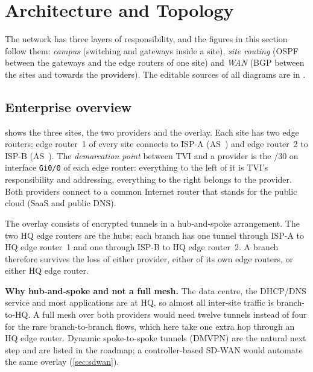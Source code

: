 \section{Architecture and Topology}\label{sec:arch}

The network has three layers of responsibility, and the figures in this section follow them:
\emph{campus} (switching and gateways inside a site), \emph{site routing} (OSPF between the gateways and
the edge routers of one site) and \emph{WAN} (BGP between the sites and towards the providers). The
editable sources of all diagrams are in .

\subsection{Enterprise overview}\label{sec:arch-overview}
 shows the three sites, the two providers and the overlay. Each site has two edge
routers; edge router~1 of every site connects to ISP-A (AS~\FactAsIspA) and edge router~2 to ISP-B
(AS~\FactAsIspB). The \emph{demarcation point} between TVI and a provider is the /30 on interface
\texttt{Gi0/0} of each edge router: everything to the left of it is TVI's responsibility and addressing,
everything to the right belongs to the provider. Both providers connect to a common Internet router that
stands for the public cloud (SaaS and public DNS).

The overlay consists of \FactNumTunnels{} encrypted tunnels in a hub-and-spoke arrangement. The two HQ edge
routers are the hubs; each branch has one tunnel through ISP-A to HQ edge router~1 and one through ISP-B to HQ
edge router~2. A branch therefore survives the loss of either provider, either of its own edge routers, or
either HQ edge router.


\textbf{Why hub-and-spoke and not a full mesh.} The data centre, the DHCP/DNS service and most
applications are at HQ, so almost all inter-site traffic is branch-to-HQ. A full mesh over both providers
would need twelve tunnels instead of four for the rare branch-to-branch flows, which here take one extra
hop through an HQ edge router. Dynamic spoke-to-spoke tunnels (DMVPN) are the natural next step and are
listed in the roadmap; a controller-based SD-WAN would automate the same overlay (\cref{sec:sdwan}).

